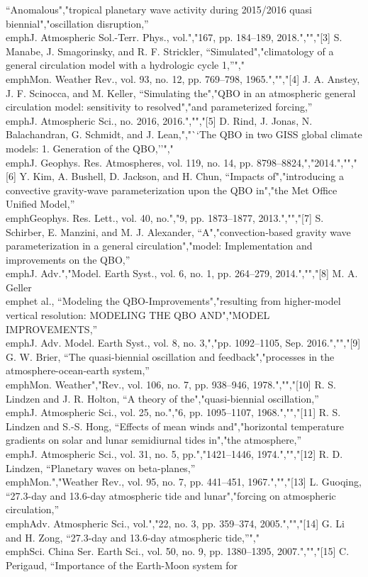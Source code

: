 {{{{{{{``Anomalous","tropical planetary wave activity during 2015/2016 quasi biennial","oscillation disruption,'' \\emph{J. Atmospheric Sol.-Terr. Phys.}, vol.","167, pp. 184--189, 2018.","","{[}3{]} S. Manabe, J. Smagorinsky, and R. F. Strickler, ``Simulated","climatology of a general circulation model with a hydrologic cycle 1,''","\\emph{Mon. Weather Rev.}, vol. 93, no. 12, pp. 769--798, 1965.","","{[}4{]} J. A. Anstey, J. F. Scinocca, and M. Keller, ``Simulating the","QBO in an atmospheric general circulation model: sensitivity to resolved","and parameterized forcing,'' \\emph{J. Atmospheric Sci.}, no. 2016, 2016.","","{[}5{]} D. Rind, J. Jonas, N. Balachandran, G. Schmidt, and J. Lean,","``The QBO in two GISS global climate models: 1. Generation of the QBO,''","\\emph{J. Geophys. Res. Atmospheres}, vol. 119, no. 14, pp. 8798--8824,","2014.","","{[}6{]} Y. Kim, A. Bushell, D. Jackson, and H. Chun, ``Impacts of","introducing a convective gravity‐wave parameterization upon the QBO in","the Met Office Unified Model,'' \\emph{Geophys. Res. Lett.}, vol. 40, no.","9, pp. 1873--1877, 2013.","","{[}7{]} S. Schirber, E. Manzini, and M. J. Alexander, ``A","convection‐based gravity wave parameterization in a general circulation","model: Implementation and improvements on the QBO,'' \\emph{J. Adv.","Model. Earth Syst.}, vol. 6, no. 1, pp. 264--279, 2014.","","{[}8{]} M. A. Geller \\emph{et al.}, ``Modeling the QBO-Improvements","resulting from higher-model vertical resolution: MODELING THE QBO AND","MODEL IMPROVEMENTS,'' \\emph{J. Adv. Model. Earth Syst.}, vol. 8, no. 3,","pp. 1092--1105, Sep. 2016.","","{[}9{]} G. W. Brier, ``The quasi-biennial oscillation and feedback","processes in the atmosphere-ocean-earth system,'' \\emph{Mon. Weather","Rev.}, vol. 106, no. 7, pp. 938--946, 1978.","","{[}10{]} R. S. Lindzen and J. R. Holton, ``A theory of the","quasi-biennial oscillation,'' \\emph{J. Atmospheric Sci.}, vol. 25, no.","6, pp. 1095--1107, 1968.","","{[}11{]} R. S. Lindzen and S.-S. Hong, ``Effects of mean winds and","horizontal temperature gradients on solar and lunar semidiurnal tides in","the atmosphere,'' \\emph{J. Atmospheric Sci.}, vol. 31, no. 5, pp.","1421--1446, 1974.","","{[}12{]} R. D. Lindzen, ``Planetary waves on beta-planes,'' \\emph{Mon.","Weather Rev.}, vol. 95, no. 7, pp. 441--451, 1967.","","{[}13{]} L. Guoqing, ``27.3-day and 13.6-day atmospheric tide and lunar","forcing on atmospheric circulation,'' \\emph{Adv. Atmospheric Sci.}, vol.","22, no. 3, pp. 359--374, 2005.","","{[}14{]} G. Li and H. Zong, ``27.3-day and 13.6-day atmospheric tide,''","\\emph{Sci. China Ser. Earth Sci.}, vol. 50, no. 9, pp. 1380--1395, 2007.","","{[}15{]} C. Perigaud, ``Importance of the Earth-Moon system for }}}}}}}
